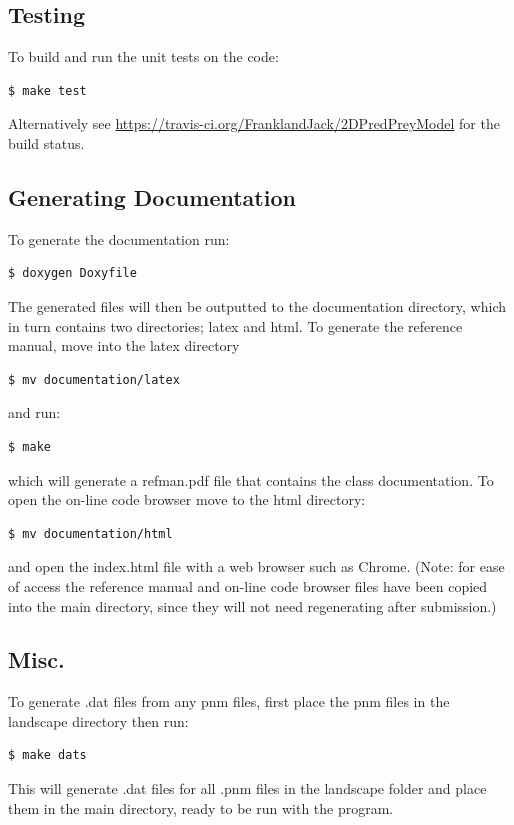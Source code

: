 \subsection{Testing}
To build and run the unit tests on the code:
\begin{lstlisting}[language=bash]
$ make test
\end{lstlisting}
Alternatively see \url{https://travis-ci.org/FranklandJack/2DPredPreyModel} for the build status.

\subsection{Generating Documentation}
To generate the documentation run:
\begin{lstlisting}[language=bash]
$ doxygen Doxyfile
\end{lstlisting}
The generated files will then be outputted to the documentation directory, which in turn contains two directories; latex and html. To generate the reference manual, move into the latex directory
\begin{lstlisting}[language=bash]
$ mv documentation/latex
\end{lstlisting}
and run:
\begin{lstlisting}[language=bash]
$ make
\end{lstlisting}
which will generate a refman.pdf file that contains the class documentation. To open the on-line code browser move to the html directory:
 \begin{lstlisting}[language=bash]
$ mv documentation/html
\end{lstlisting}
and open the index.html file with a web browser such as Chrome.
(Note: for ease of access the reference manual and on-line code browser files have been copied into the main directory, since they will not need regenerating after submission.)

\subsection{Misc.}
To generate .dat files from any pnm files, first place the pnm files in the landscape directory then run:

\begin{lstlisting}[language=bash]
$ make dats
\end{lstlisting}
This will generate .dat files for all .pnm files in the landscape folder and place them in the main directory, ready to be run with the program. \\


